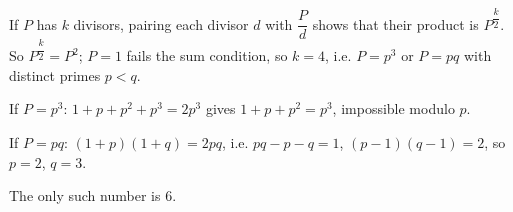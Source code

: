 If $P$ has $k$ divisors, pairing each divisor $d$ with $\dfrac {P}{d}$ shows that their product is $P^{\dfrac {k}{2}}$. So $P^{\dfrac {k}{2}}=P^2$; $P=1$ fails the sum condition, so $k=4$, i.e. $P=p^3$ or $P=pq$ with distinct primes $p<q$.

If $P=p^3$: $1+p+p^2+p^3=2p^3$ gives $1+p+p^2=p^3$, impossible modulo $p$.

If $P=pq$: $(1+p)(1+q)=2pq$, i.e. $pq-p-q=1$, $(p-1)(q-1)=2$, so $p=2$, $q=3$.

The only such number is $\boxed{6}$.
